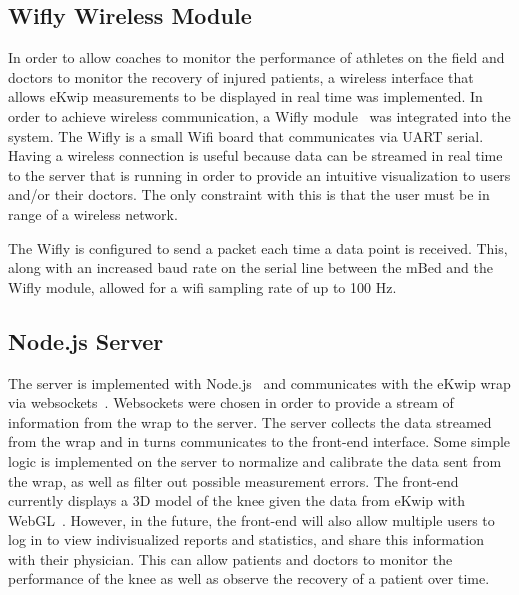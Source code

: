 \subsection {Wifly Wireless Module}
In order to allow coaches to monitor the performance of athletes on the field and doctors to monitor the recovery of injured patients, a wireless interface that allows eKwip measurements to be displayed in real time was implemented. In order to achieve wireless communication, a Wifly module~\cite{wifly} was integrated into the system. The Wifly is a small Wifi board that communicates via UART serial. Having a wireless connection is useful because data can be streamed in real time to the server that is running in order to provide an intuitive visualization to users and/or their doctors. The only constraint with this is that the user must be in range of a wireless network.

The Wifly is configured to send a packet each time a data point is received. This, along with an increased baud rate on the serial line between the mBed and the Wifly module, allowed for a wifi sampling rate of up to 100 Hz.

\subsection {Node.js Server}
The server is implemented with Node.js~\cite{node} and communicates with the eKwip wrap via websockets~\cite{websockets}. Websockets were chosen in order to provide a stream of information from the wrap to the server. The server collects the data streamed from the wrap and in turns communicates to the front-end interface. Some simple logic is implemented on the server to normalize and calibrate the data sent from the wrap, as well as filter out possible measurement errors. The front-end currently displays a 3D model of the knee given the data from eKwip with WebGL~\cite{webgl}. However, in the future, the front-end will also allow multiple users to log in to view indivisualized reports and statistics, and share this information with their physician. This can allow patients and doctors to monitor the performance of the knee as well as observe the recovery of a patient over time.
